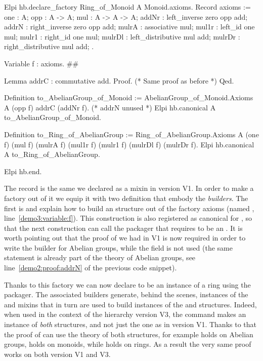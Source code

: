 \documentclass[a4paper,UKenglish,cleveref, autoref]{lipics-v2019}
\newcommand{\mixin}{mixin}
\newcommand{\mixins}{mixins}
\newcommand{\factory}{factory}
\newcommand{\packager}{packager}
\newcommand{\builder}{builder}
\theoremstyle{implem}
\theoremstyle{implem}
\theoremstyle{axiom}
\theoremstyle{abscommand}
\theoremstyle{command}
\begin{document}
\begin{coqcode}
Elpi hb.declare_factory Ring_of_Monoid A Monoid.axioms.
  Record axioms := {
    one : A;
    opp : A -> A;
    mul : A -> A -> A;
    addNr : left_inverse zero opp add;
    addrN : right_inverse zero opp add;
    mulrA : associative mul;
    mul1r : left_id one mul;
    mulr1 : right_id one mul;
    mulrDl : left_distributive mul add;
    mulrDr : right_distributive mul add;
  }.

  Variable f : axioms.                                                          #\label{demo3:variable:f}#

  Lemma addrC : commutative add.
  Proof. (* Same proof as before *) Qed.

  Definition to_AbelianGroup_of_Monoid :=
    AbelianGroup_of_Monoid.Axioms A (opp f) addrC (addNr f). (* addrN unused *)
  Elpi hb.canonical A to_AbelianGroup_of_Monoid.

  Definition to_Ring_of_AbelianGroup :=
    Ring_of_AbelianGroup.Axioms A (one f) (mul f)
      (mulrA f) (mul1r f) (mulr1 f) (mulrDl f) (mulrDr f).
  Elpi hb.canonical A to_Ring_of_AbelianGroup.

Elpi hb.end.
\end{coqcode}

The record  is the same we declared as a \mixin{}
in version V1. In order to make a \factory{} out of it we equip it with
two definition that embody the \emph{\builder{}s}.
The first is  and
explain how to build an  structure out of the \factory{}
axioms (named , line~\ref{demo3:variable:f}).
This construction is also registered as canonical for ,
so that the next construction  can call
the  \packager{} that requires  to be
an .
It is worth pointing out that the proof of  we had in V1 is now
required in order to write the \builder{} for Abelian groups, while
the  field is not used (the same statement is already part of
the theory of Abelian groups, see line~\ref{demo2:proof:addrN} of the previous
code snippet).

Thanks to this \factory{} we can now declare  to be an instance
of a ring using the  \packager{}.
The associated \builder{}s generate, behind the scenes, instances of the
 and  \mixins{}
that in turn are used to build instances of the  and 
structures. Indeed, when used in the context of the hierarchy version V3,
the command 
makes  an instance of \emph{both} structures, and not just the 
one as in version V1.
Thanks to that the proof of  can use the theory of
both structures, for example  holds on Abelian groups,
 holds on monoids, while  holds on rings.
As a result the very same proof works on both
version V1 and V3.
\end{document}
